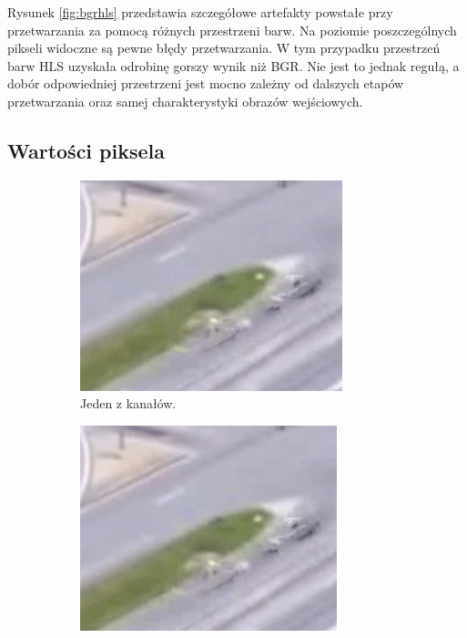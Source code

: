 Rysunek \ref{fig:bgrhls} przedstawia szczegółowe artefakty powstałe przy przetwarzania za pomocą różnych przestrzeni barw. Na poziomie poszczególnych pikseli widoczne są pewne błędy przetwarzania. W tym przypadku przestrzeń barw HLS uzyskała odrobinę gorszy wynik niż BGR. Nie jest to jednak regułą, a dobór odpowiedniej przestrzeni jest mocno zależny od dalszych etapów przetwarzania oraz samej charakterystyki obrazów wejściowych.
\subsection{Wartości piksela}
\begin{figure}[H]
\centering
\begin{subfigure}{.333\textwidth}
  \centering
  \includegraphics[width=.95\linewidth]{img/channel-art.png}
  \caption{Jeden z kanałów.}
\end{subfigure}%
\begin{subfigure}{.333\textwidth}
  \centering
  \includegraphics[width=.95\linewidth]{img/bgr-art.png}

\end{subfigure}
\end{figure}
